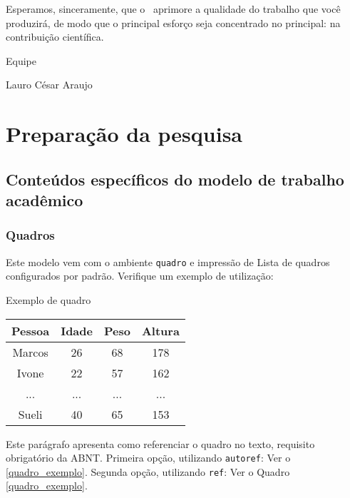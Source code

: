 \documentclass[
	12pt,				%
	openright,			%
    oneside,
	a4paper,			%
	chapter=TITLE,
	english,			%
	brazil				%
	]{abntex2}
\begin{document}
Esperamos, sinceramente, que o \abnTeX\ aprimore a qualidade do trabalho que
você produzirá, de modo que o principal esforço seja concentrado no principal:
na contribuição científica.

Equipe \abnTeX 

Lauro César Araujo

\part{Preparação da pesquisa}



\chapter{Conteúdos específicos do modelo de trabalho acadêmico}\label{cap_trabalho_academico}

\section{Quadros}

Este modelo vem com o ambiente \texttt{quadro} e impressão de Lista de quadros 
configurados por padrão. Verifique um exemplo de utilização:

\begin{quadro}[htb]
\caption{\label{quadro_exemplo}Exemplo de quadro}
\begin{tabular}{|c|c|c|c|}
	\hline
	\textbf{Pessoa} & \textbf{Idade} & \textbf{Peso} & \textbf{Altura} \\ \hline
	Marcos & 26    & 68   & 178    \\ \hline
	Ivone  & 22    & 57   & 162    \\ \hline
	...    & ...   & ...  & ...    \\ \hline
	Sueli  & 40    & 65   & 153    \\ \hline
\end{tabular}
\end{quadro}

Este parágrafo apresenta como referenciar o quadro no texto, requisito
obrigatório da ABNT. 
Primeira opção, utilizando \texttt{autoref}: Ver o \autoref{quadro_exemplo}. 
Segunda opção, utilizando  \texttt{ref}: Ver o Quadro \ref{quadro_exemplo}.
\end{document}

